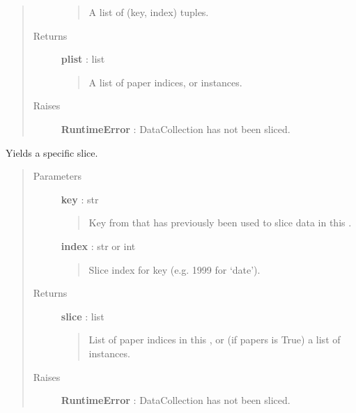 \documentclass[letterpaper,10pt,english]{sphinxmanual}
\begin{document}
\begin{fulllineitems}
\begin{fulllineitems}
\begin{quote}
\begin{description}
\begin{quote}
A list of (key, index) tuples.
\end{quote}

\item[{Returns }] \leavevmode
\textbf{plist} : list
\begin{quote}

A list of paper indices, or {\hyperref[tethne:tethne.data.Paper]{}} instances.
\end{quote}

\item[{Raises }] \leavevmode
\textbf{RuntimeError} : DataCollection has not been sliced.

\end{description}\end{quote}

\end{fulllineitems}


\begin{fulllineitems}
\label{tethne:tethne.data.DataCollection.get_slice}
Yields a specific slice.
\begin{quote}\begin{description}
\item[{Parameters }] \leavevmode
\textbf{key} : str
\begin{quote}

Key from {\hyperref[tethne:tethne.data.Paper]{}} that has previously been used to slice data
in this {\hyperref[tethne:tethne.data.DataCollection]{}} .
\end{quote}

\textbf{index} : str or int
\begin{quote}

Slice index for key (e.g. 1999 for `date').
\end{quote}

\item[{Returns }] \leavevmode
\textbf{slice} : list
\begin{quote}

List of paper indices in this {\hyperref[tethne:tethne.data.DataCollection]{}} , or (if
papers is True) a list of {\hyperref[tethne:tethne.data.Paper]{}} instances.
\end{quote}

\item[{Raises }] \leavevmode
\textbf{RuntimeError} : DataCollection has not been sliced.


\end{description}
\end{quote}
\end{fulllineitems}
\end{fulllineitems}
\end{document}
